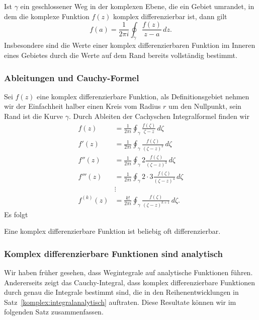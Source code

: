 \begin{satz}[Cauchy]
Ist $\gamma$ ein geschlossener Weg in der komplexen Ebene, die ein
Gebiet umrandet, in dem die komplexe Funktion $f(z)$ komplex
differenzierbar ist, dann gilt
\[
f(a)=\frac{1}{2\pi i}\oint_{\gamma}\frac{f(z)}{z-a}\,dz.
\]
Insbesondere sind die Werte einer komplex differenzierbaren Funktion
im Inneren eines Gebietes durch die Werte auf dem Rand bereits vollständig
bestimmt.
\end{satz}

%
%
\subsubsection{Ableitungen und Cauchy-Formel}
Sei $f(z)$ eine komplex differenzierbare Funktion, als Definitionsgebiet
nehmen wir der Einfachheit halber einen Kreis vom Radius $r$ um den Nullpunkt,
sein Rand ist die Kurve $\gamma$.
Durch Ableiten der Cachyschen Integralformel finden wir
\begin{align*}
f(z)
&=
\frac1{2\pi i}\oint_{\gamma}\frac{f(\zeta)}{\zeta-z}\,d\zeta
\\
f'(z)
&=
\frac1{2\pi i}\oint_{\gamma}\frac{f(\zeta)}{(\zeta-z)^2}\,d\zeta
\\
f'' (z)
&=
\frac1{2\pi i}\oint_{\gamma}2\frac{f(\zeta)}{(\zeta-z)^3}\,d\zeta
\\
f'''(z)
&=
\frac1{2\pi i}\oint_{\gamma}2\cdot 3\frac{f(\zeta)}{(\zeta-z)^4}\,d\zeta
\\
&\vdots
\\
f^{(k)}(z)
&=
\frac{k!}{2\pi i}\oint_{\gamma}\frac{f(\zeta)}{(\zeta-z)^{k+1}}\,d\zeta.
\end{align*}
Es folgt

\begin{satz}
Eine komplex differenzierbare Funktion ist beliebig oft differenzierbar.
\end{satz}

%
%
\subsubsection{Komplex differenzierbare Funktionen sind analytisch}
Wir haben früher gesehen, dass Wegintegrale auf analytische Funktionen
führen.
Andererseits zeigt das Cauchy-Integral, dass komplex differenzierbare
Funktionen durch genau die Integrale bestimmt sind, die in den
Reihenentwicklungen in Satz~\ref{komplex:integralanalytisch} auftraten.
Diese Resultate können wir im folgenden Satz zusammenfassen.

